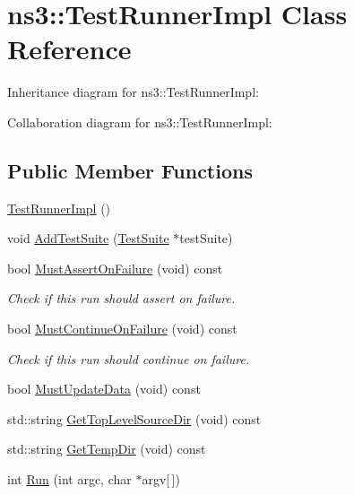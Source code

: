 \hypertarget{classns3_1_1TestRunnerImpl}{}\section{ns3\+:\+:Test\+Runner\+Impl Class Reference}
\label{classns3_1_1TestRunnerImpl}


Inheritance diagram for ns3\+:\+:Test\+Runner\+Impl\+:


Collaboration diagram for ns3\+:\+:Test\+Runner\+Impl\+:
\subsection*{Public Member Functions}
\begin{DoxyCompactItemize}
\item 
\hyperlink{classns3_1_1TestRunnerImpl_ac5449e8e45109bc565aeeb9a9c3726a4}{Test\+Runner\+Impl} ()
\item 
void \hyperlink{classns3_1_1TestRunnerImpl_ac57b6e1257064733b0aeab8e9fbc53c2}{Add\+Test\+Suite} (\hyperlink{classns3_1_1TestSuite}{Test\+Suite} $\ast$test\+Suite)
\item 
bool \hyperlink{classns3_1_1TestRunnerImpl_a5b84111701472b8e05e16383e8d87a81}{Must\+Assert\+On\+Failure} (void) const 
\begin{DoxyCompactList}\small\item\em Check if this run should assert on failure. \end{DoxyCompactList}\item 
bool \hyperlink{classns3_1_1TestRunnerImpl_a9901fc0a0085a4f48ce4d34bc7860da8}{Must\+Continue\+On\+Failure} (void) const 
\begin{DoxyCompactList}\small\item\em Check if this run should continue on failure. \end{DoxyCompactList}\item 
bool \hyperlink{classns3_1_1TestRunnerImpl_a68e53303c2636039ac9455fbdbbe25ea}{Must\+Update\+Data} (void) const 
\item 
std\+::string \hyperlink{classns3_1_1TestRunnerImpl_a1863e4b4b0410ef4abb30424cc50e277}{Get\+Top\+Level\+Source\+Dir} (void) const 
\item 
std\+::string \hyperlink{classns3_1_1TestRunnerImpl_abc8c546f5141fd451d79294f3d7b4358}{Get\+Temp\+Dir} (void) const 
\item 
int \hyperlink{classns3_1_1TestRunnerImpl_aab866f90a3b2d8fa20dabded33e35012}{Run} (int argc, char $\ast$argv\mbox{[}$\,$\mbox{]})
\end{DoxyCompactItemize}
